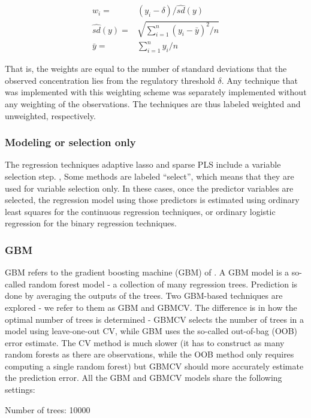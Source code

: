 \documentclass[english]{article}\usepackage[]{graphicx}\usepackage[]{color}
\numberwithin{equation}{section}
\numberwithin{figure}{section}
\renewcommand\[{\begin{equation}}
\renewcommand\]{\end{equation}}
\begin{document}
\begin{align*}
w_{i}= & (y_{i}-\delta)/\hat{{sd}}(y)\\
\hat{{sd}}(y)= & \sqrt{\sum_{i=1}^{n}(y_{i}-\bar{{y}})^{2}/n}\\
\bar{{y}}= & \sum_{i=1}^{n}y_{i}/n
\end{align*}


That is, the weights are equal to the number of standard deviations
that the observed concentration lies from the regulatory threshold
$\delta$. Any technique that was implemented with this weighting
scheme was separately implemented without any weighting of the observations.
The techniques are thus labeled weighted and unweighted, respectively.


\subsubsection*{Modeling or selection only}

The regression techniques adaptive lasso and sparse PLS include a
variable selection step. , Some methods are labeled ``select'',
which means that they are used for variable selection only. In these
cases, once the predictor variables are selected, the regression model
using those predictors is estimated using ordinary least squares for
the continuous regression techniques, or ordinary logistic regression
for the binary regression techniques.


\subsubsection{GBM}

GBM refers to the gradient boosting machine (GBM) of \citet{Friedman-2001}.
A GBM model is a so-called random forest model - a collection of many
regression trees. Prediction is done by averaging the outputs of the
trees. Two GBM-based techniques are explored - we refer to them as
GBM and GBMCV. The difference is in how the optimal number of trees
is determined - GBMCV selects the number of trees in a model using
leave-one-out CV, while GBM uses the so-called out-of-bag (OOB) error
estimate. The CV method is much slower (it has to construct as many
random forests as there are observations, while the OOB method only
requires computing a single random forest) but GBMCV should more accurately
estimate the prediction error. All the GBM and GBMCV models share
the following settings:

Number of trees: 10000
\end{document}
